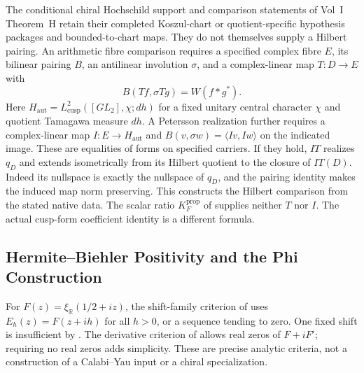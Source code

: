 The conditional chiral Hochschild support and comparison statements
of Vol~I Theorem~H retain their completed Koszul-chart or
quotient-specific hypothesis packages and bounded-to-chart maps.
They do not themselves supply a Hilbert pairing.
An arithmetic fibre comparison requires a specified
complex fibre $E$, its bilinear pairing $B$, an antilinear involution
$\sigma$, and a complex-linear map $T:D\to E$ with
\[
 B(Tf,\sigma Tg)=W(f*g^*).
\]
Here $H_{\mathrm{aut}}=L^2_{\mathrm{cusp}}([GL_2],\chi;dh)$ for a fixed unitary central character $\chi$ and quotient Tamagawa measure $dh$.
A Petersson realization further requires a complex-linear map $I:E\to H_{\mathrm{aut}}$
and $B(v,\sigma w)=\langle Iv,Iw\rangle$ on the indicated image.
These are equalities of forms on specified carriers. If they hold,
$IT$ realizes $q_D$ and extends isometrically from its Hilbert
quotient to the closure of $IT(D)$.
Indeed its nullspace is exactly the nullspace of $q_D$, and the
pairing identity makes the induced map norm preserving.
This constructs the Hilbert comparison from the stated native data.
The scalar ratio $K_F^{\mathrm{prop}}$ of
 supplies neither $T$ nor $I$.
The actual cusp-form coefficient identity
 is a different formula.
\subsection{Hermite--Biehler Positivity and the Phi Construction}
\label{v4-arith:w6-i:W5-J-alignment}

For $F(z)=\xi_{\mathbb R}(1/2+iz)$, the shift-family criterion of
 uses $E_h(z)=F(z+ih)$ for
all $h>0$, or a sequence tending to zero. One fixed shift is
insufficient by .
The derivative criterion of 
allows real zeros of $F+iF'$; requiring no real zeros adds simplicity.
These are precise analytic criteria, not a construction of a
Calabi--Yau input or a chiral specialization.

